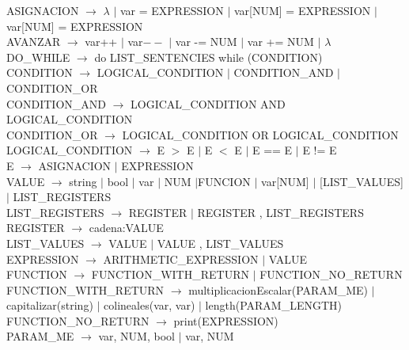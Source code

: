 \documentclass[10pt,a4paper]{article}
\begin{document}
ASIGNACION $\rightarrow$ $\lambda$ $|$ var = EXPRESSION $|$ var[NUM] = EXPRESSION $|$ var[NUM] = EXPRESSION\\

AVANZAR $\rightarrow$ var++ $|$ var$--$ $|$ var -= NUM $|$ var += NUM $|$ $\lambda$ \\

DO\_WHILE $\rightarrow$ do LIST\_SENTENCIES while (CONDITION) \\

CONDITION $\rightarrow$ LOGICAL\_CONDITION $|$ CONDITION\_AND $|$ CONDITION\_OR \\

CONDITION\_AND $\rightarrow$ LOGICAL\_CONDITION AND LOGICAL\_CONDITION \\

CONDITION\_OR $\rightarrow$ LOGICAL\_CONDITION OR LOGICAL\_CONDITION \\

LOGICAL\_CONDITION $\rightarrow$ E $>$ E $|$ E $<$ E $|$ E == E $|$ E != E \\

E $\rightarrow$ ASIGNACION $|$ EXPRESSION \\

VALUE $\rightarrow$ string $|$ bool $|$ var $|$ NUM $|$FUNCION $|$ var[NUM] $|$ [LIST\_VALUES] $|$ LIST\_REGISTERS\\

LIST\_REGISTERS $\rightarrow$ REGISTER $|$ REGISTER , LIST\_REGISTERS\\

REGISTER $\rightarrow$ cadena:VALUE \\

LIST\_VALUES $\rightarrow$ VALUE $|$ VALUE , LIST\_VALUES \\

EXPRESSION $\rightarrow$  ARITHMETIC\_EXPRESSION $|$ VALUE \\

FUNCTION $\rightarrow$ FUNCTION\_WITH\_RETURN $|$ FUNCTION\_NO\_RETURN \\

FUNCTION\_WITH\_RETURN $\rightarrow$ multiplicacionEscalar(PARAM\_ME) $|$  capitalizar(string) $|$  colineales(var, var) $|$ length(PARAM\_LENGTH) \\

FUNCTION\_NO\_RETURN $\rightarrow$ print(EXPRESSION) \\

PARAM\_ME $\rightarrow$ var, NUM, bool $|$ var, NUM \\
\end{document}

